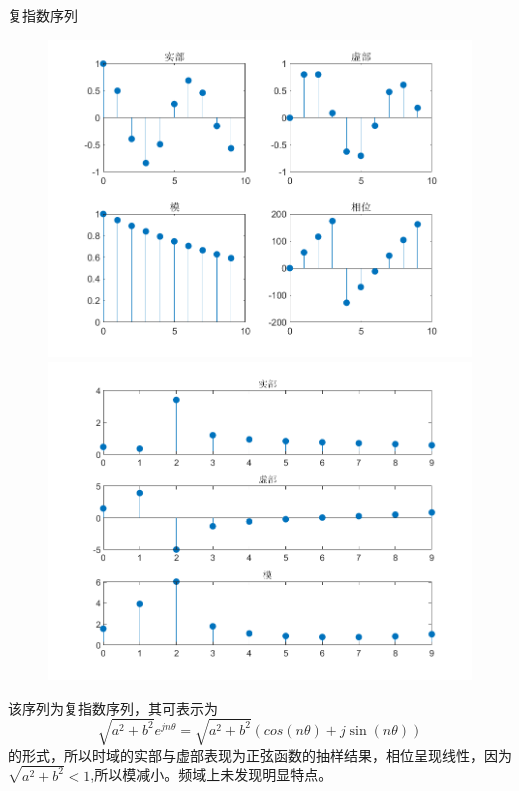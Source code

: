 \documentclass{beamer}
\begin{document}
\begin{frame}[t]{复指数序列}
    \small
    \begin{figure}[H]
        \centering
        \begin{minipage}[t]{0.48\textwidth}
        \centering
        \includegraphics[width=\textwidth]{figure/复指数序列.png}
        \end{minipage}
        \begin{minipage}[t]{0.48\textwidth}
        \centering
        \includegraphics[width=\textwidth]{figure/频谱_复指数序列.png}
        \end{minipage}
    \end{figure}
    \begin{block}{}
        该序列为复指数序列，其可表示为$$\sqrt{a^2+b^2}e^{jn\theta} =\sqrt{a^2+b^2}(cos(n\theta)+j\sin(n\theta))$$的形式，所以时域的实部与虚部表现为正弦函数的抽样结果，相位呈现线性，因为$\sqrt{a^2+b^2}<1$,所以模减小。频域上未发现明显特点。
    \end{block}
\end{frame}
\end{document}
